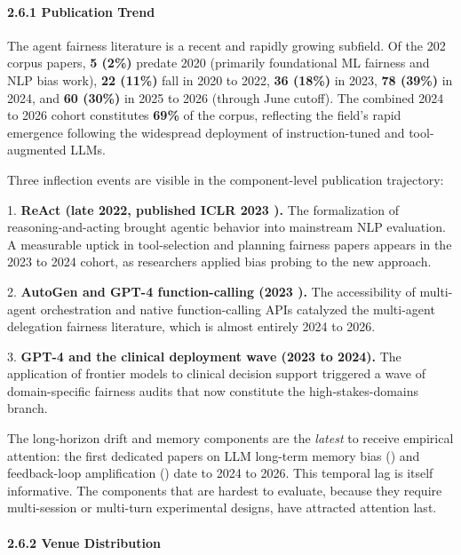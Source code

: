 \documentclass[10pt]{article}
\begin{document}
\paragraph*{2.6.1 Publication Trend}

The agent fairness literature is a recent and rapidly growing subfield. Of the 202 corpus papers, \textbf{5 (2\%)} predate 2020 (primarily foundational ML fairness and NLP bias work), \textbf{22 (11\%)} fall in 2020 to 2022, \textbf{36 (18\%)} in 2023, \textbf{78 (39\%)} in 2024, and \textbf{60 (30\%)} in 2025 to 2026 (through June cutoff). The combined 2024 to 2026 cohort constitutes \textbf{69\%} of the corpus, reflecting the field's rapid emergence following the widespread deployment of instruction-tuned and tool-augmented LLMs.

Three inflection events are visible in the component-level publication trajectory:

1. \textbf{ReAct (late 2022, published ICLR 2023 \cite{yao2023react}).} The formalization of reasoning-and-acting brought agentic behavior into mainstream NLP evaluation. A measurable uptick in tool-selection and planning fairness papers appears in the 2023 to 2024 cohort, as researchers applied bias probing to the new approach.

2. \textbf{AutoGen and GPT-4 function-calling (2023 \cite{wu2023autogen}).} The accessibility of multi-agent orchestration and native function-calling APIs catalyzed the multi-agent delegation fairness literature, which is almost entirely 2024 to 2026.

3. \textbf{GPT-4 and the clinical deployment wave (2023 to 2024).} The application of frontier models to clinical decision support \cite{omar2025sociodemographic,poulain2024bias,zack2024coding} triggered a wave of domain-specific fairness audits that now constitute the high-stakes-domains branch.

The long-horizon drift and memory components are the \emph{latest} to receive empirical attention: the first dedicated papers on LLM long-term memory bias (\cite{ma2026implicit}) and feedback-loop amplification (\cite{wyllie2024fairness,wang2026observations}) date to 2024 to 2026. This temporal lag is itself informative. The components that are hardest to evaluate, because they require multi-session or multi-turn experimental designs, have attracted attention last.

\paragraph*{2.6.2 Venue Distribution}
\end{document}
